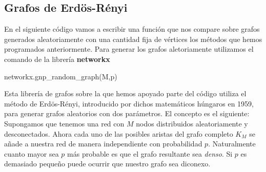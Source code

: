 \documentclass[twoside,a4paper,openright,12pt,tikz]{book}
\begin{document}
\subsection{Grafos de Erdös-Rényi}
En el siguiente código vamos a escribir una función que nos compare sobre grafos generados aleatoriamente con una cantidad fija de vértices los métodos que hemos programados anteriormente. Para generar los grafos aletoriamente utilizamos el comando de la librería \textbf{networkx}\\
\begin{pythone}
networkx.gnp_random_graph(M,p)
\end{pythone}
Esta librería de grafos sobre la que hemos apoyado parte del código utiliza el método de Erdös-Rényi, introducido por dichos matemáticos húngaros en 1959, para generar grafos aleatorios con dos parámetros. El concepto es el siguiente: Supongamos que tenemos una red con $M$ nodos distribuidos aleatoriamente y desconectados. Ahora cada uno de las posibles aristas del grafo completo $K_M$ se añade a nuestra red de manera independiente con probabilidad $p$. Naturalmente cuanto mayor sea $p$ más probable es que el grafo resultante sea \textit{denso}. Si $p$ es demasiado pequeño puede ocurrir que nuestro grafo sea diconexo. 
\end{document}
